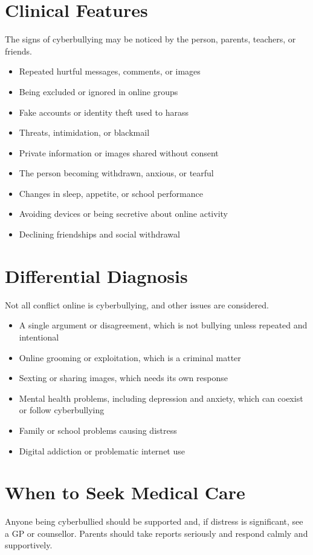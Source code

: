\section*{Clinical Features}
The signs of cyberbullying may be noticed by the person, parents, teachers, or friends.

\begin{itemize}
    \item Repeated hurtful messages, comments, or images
    \item Being excluded or ignored in online groups
    \item Fake accounts or identity theft used to harass
    \item Threats, intimidation, or blackmail
    \item Private information or images shared without consent
    \item The person becoming withdrawn, anxious, or tearful
    \item Changes in sleep, appetite, or school performance
    \item Avoiding devices or being secretive about online activity
    \item Declining friendships and social withdrawal
\end{itemize}

\section*{Differential Diagnosis}
Not all conflict online is cyberbullying, and other issues are considered.

\begin{itemize}
    \item A single argument or disagreement, which is not bullying unless repeated and intentional
    \item Online grooming or exploitation, which is a criminal matter
    \item Sexting or sharing images, which needs its own response
    \item Mental health problems, including depression and anxiety, which can coexist or follow cyberbullying
    \item Family or school problems causing distress
    \item Digital addiction or problematic internet use
\end{itemize}

\section*{When to Seek Medical Care}
Anyone being cyberbullied should be supported and, if distress is significant, see a GP or counsellor. Parents should take reports seriously and respond calmly and supportively.

